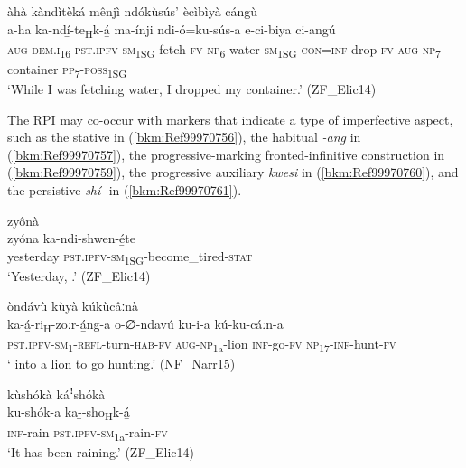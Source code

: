 \ea
\label{bkm:Ref431806450}
àhà kàndìtèká mênjì ndókùsús’ ècìbìyà cángù\\
\gll a-ha    ka-ndí̲-te\textsubscript{H}k-á̲    ma-ínji  ndi-ó=ku-sús-a e-ci-biya    ci-angú\\
\textsc{aug}-\textsc{dem}.\textsc{i}\textsubscript{16}  \textsc{pst}.\textsc{ipfv}-\textsc{sm}\textsubscript{1SG}-fetch-\textsc{fv}  \textsc{np}\textsubscript{6}-water  \textsc{sm}\textsubscript{1SG}-\textsc{con}=\textsc{inf}-drop-\textsc{fv}
\textsc{aug}-\textsc{np}\textsubscript{7}-container  \textsc{pp}\textsubscript{7}-\textsc{poss}\textsubscript{1SG}\\
\glt ‘While I was fetching water, I dropped my container.’ (ZF\_Elic14)
\z

The RPI may co-occur with markers that indicate a type of imperfective aspect, such as the stative in (\ref{bkm:Ref99970756}), the habitual \textit{-ang} in (\ref{bkm:Ref99970757}), the progressive-marking fronted-infinitive construction in (\ref{bkm:Ref99970759}), the progressive auxiliary \textit{kwesi} in (\ref{bkm:Ref99970760}), and the persistive \textit{shí}- in (\ref{bkm:Ref99970761}).

\ea
\label{bkm:Ref99970756}
zyônà \\
\gll zyóna    ka-ndi-shwen-é̲te\\
yesterday  \textsc{pst}.\textsc{ipfv}-\textsc{sm}\textsubscript{1SG}-become\_tired-\textsc{stat}\\
\glt ‘Yesterday, .’ (ZF\_Elic14)
\z

\ea
\label{bkm:Ref99970757}
 òndávù kùyà kúkùcâːnà\\
\gll ka-á̲-ri\textsubscript{H}-zoːr-á̲ng-a      o-∅-ndavú ku-i-a    kú-ku-cáːn-a \\
\textsc{pst}.\textsc{ipfv}-\textsc{sm}\textsubscript{1}-\textsc{refl}-turn-\textsc{hab}-\textsc{fv}  \textsc{aug}-\textsc{np}\textsubscript{1a}-lion
\textsc{inf}-go-\textsc{fv}  \textsc{np}\textsubscript{17}-\textsc{inf}-hunt-\textsc{fv}\\
\glt ‘ into a lion to go hunting.’ (NF\_Narr15)
\z

\ea
\label{bkm:Ref99970759}
kùshókà káꜝshókà\\
\gll ku-shók-a  ka-̲-sho\textsubscript{H}k-á̲\\
\textsc{inf}-rain  \textsc{pst}.\textsc{ipfv}-\textsc{sm}\textsubscript{1a}-rain-\textsc{fv}\\
\glt ‘It has been raining.’ (ZF\_Elic14)
\z

